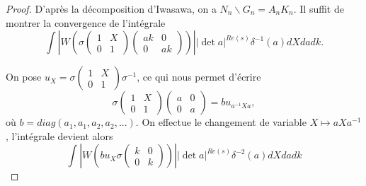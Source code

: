 \documentclass{amsart}
\begin{document}
 \begin{proof}
 D'après la décomposition d'Iwasawa, on a $N_n\backslash{G_n} = A_nK_n$. Il suffit de montrer la convergence de l'intégrale
 \begin{equation}
 \int |W\left(\sigma \begin{pmatrix}
1 & X \\
0 & 1
\end{pmatrix}\begin{pmatrix}
ak & 0 \\
0 & ak
\end{pmatrix}\right)||\det a|^{Re(s)} \delta^{-1}(a)dX da dk.
 \end{equation}
 
 On pose $u_X = \sigma \begin{pmatrix}
1 & X \\
0 & 1
\end{pmatrix} \sigma^{-1}$, ce qui nous permet d'écrire
\begin{equation}
\sigma \begin{pmatrix}
1 & X \\
0 & 1
\end{pmatrix}\begin{pmatrix}
a & 0 \\
0 & a
\end{pmatrix} = b u_{a^{-1}Xa},
\end{equation}
 où $b=diag(a_1,a_1,a_2,a_2,...)$. On effectue le changement de variable $X \mapsto aXa^{-1}$, l'intégrale devient alors
 \begin{equation}
 \int |W\left(b u_X \sigma \begin{pmatrix}
k & 0 \\
0 & k
\end{pmatrix}\right)||\det a|^{Re(s)} \delta^{-2}(a) dX da dk
 \end{equation}
 

\end{proof}
\end{document}
